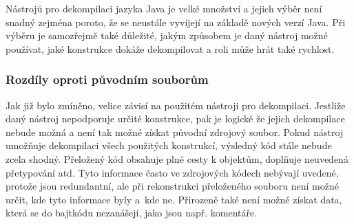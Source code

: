 				Nástrojů pro dekompilaci jazyka Java je velké množství a jejich výběr není snadný zejména poroto, že se neustále vyvíjejí na základě nových verzí Java. Při výběru je samozřejmě také důležité, jakým způsobem je daný nástroj možné používat, jaké konstrukce dokáže dekompilovat a roli může hrát také rychlost.
				
			\subsubsection{Rozdíly oproti původním souborům}
				Jak již bylo zmíněno, velice závisí na použitém nástroji pro dekompilaci. Jestliže daný nástroj nepodporuje určité konstrukce, pak je logické že jejich dekompilace nebude možná a není tak možné získat původní zdrojový soubor. Pokud nástroj umožňuje dekompilaci všech použitých konstrukcí, výsledný kód stále nebude zcela shodný. Přeložený kód obsahuje plné cesty k objektům, doplňuje neuvedená přetypování atd. Tyto informace často ve zdrojových kódech nebývají uvedené, protože jsou redundantní, ale při rekonstrukci přeloženého souboru není možné určit, kde tyto informace byly a~kde ne. Přirozeně také není možné získat data, která se do bajtkódu nezanášejí, jako jsou např. komentáře.